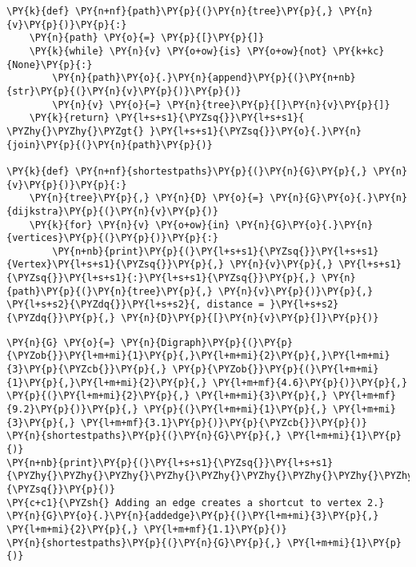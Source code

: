 \begin{Verbatim}[commandchars=\\\{\}]
\PY{k}{def} \PY{n+nf}{path}\PY{p}{(}\PY{n}{tree}\PY{p}{,} \PY{n}{v}\PY{p}{)}\PY{p}{:}
    \PY{n}{path} \PY{o}{=} \PY{p}{[}\PY{p}{]}
    \PY{k}{while} \PY{n}{v} \PY{o+ow}{is} \PY{o+ow}{not} \PY{k+kc}{None}\PY{p}{:}
        \PY{n}{path}\PY{o}{.}\PY{n}{append}\PY{p}{(}\PY{n+nb}{str}\PY{p}{(}\PY{n}{v}\PY{p}{)}\PY{p}{)}
        \PY{n}{v} \PY{o}{=} \PY{n}{tree}\PY{p}{[}\PY{n}{v}\PY{p}{]}
    \PY{k}{return} \PY{l+s+s1}{\PYZsq{}}\PY{l+s+s1}{ \PYZhy{}\PYZhy{}\PYZgt{} }\PY{l+s+s1}{\PYZsq{}}\PY{o}{.}\PY{n}{join}\PY{p}{(}\PY{n}{path}\PY{p}{)}

\PY{k}{def} \PY{n+nf}{shortestpaths}\PY{p}{(}\PY{n}{G}\PY{p}{,} \PY{n}{v}\PY{p}{)}\PY{p}{:}
    \PY{n}{tree}\PY{p}{,} \PY{n}{D} \PY{o}{=} \PY{n}{G}\PY{o}{.}\PY{n}{dijkstra}\PY{p}{(}\PY{n}{v}\PY{p}{)}
    \PY{k}{for} \PY{n}{v} \PY{o+ow}{in} \PY{n}{G}\PY{o}{.}\PY{n}{vertices}\PY{p}{(}\PY{p}{)}\PY{p}{:}
        \PY{n+nb}{print}\PY{p}{(}\PY{l+s+s1}{\PYZsq{}}\PY{l+s+s1}{Vertex}\PY{l+s+s1}{\PYZsq{}}\PY{p}{,} \PY{n}{v}\PY{p}{,} \PY{l+s+s1}{\PYZsq{}}\PY{l+s+s1}{:}\PY{l+s+s1}{\PYZsq{}}\PY{p}{,} \PY{n}{path}\PY{p}{(}\PY{n}{tree}\PY{p}{,} \PY{n}{v}\PY{p}{)}\PY{p}{,} \PY{l+s+s2}{\PYZdq{}}\PY{l+s+s2}{, distance = }\PY{l+s+s2}{\PYZdq{}}\PY{p}{,} \PY{n}{D}\PY{p}{[}\PY{n}{v}\PY{p}{]}\PY{p}{)}
\end{Verbatim}



\begin{Verbatim}[commandchars=\\\{\}]
\PY{n}{G} \PY{o}{=} \PY{n}{Digraph}\PY{p}{(}\PY{p}{\PYZob{}}\PY{l+m+mi}{1}\PY{p}{,}\PY{l+m+mi}{2}\PY{p}{,}\PY{l+m+mi}{3}\PY{p}{\PYZcb{}}\PY{p}{,} \PY{p}{\PYZob{}}\PY{p}{(}\PY{l+m+mi}{1}\PY{p}{,}\PY{l+m+mi}{2}\PY{p}{,} \PY{l+m+mf}{4.6}\PY{p}{)}\PY{p}{,} \PY{p}{(}\PY{l+m+mi}{2}\PY{p}{,} \PY{l+m+mi}{3}\PY{p}{,} \PY{l+m+mf}{9.2}\PY{p}{)}\PY{p}{,} \PY{p}{(}\PY{l+m+mi}{1}\PY{p}{,} \PY{l+m+mi}{3}\PY{p}{,} \PY{l+m+mf}{3.1}\PY{p}{)}\PY{p}{\PYZcb{}}\PY{p}{)}
\PY{n}{shortestpaths}\PY{p}{(}\PY{n}{G}\PY{p}{,} \PY{l+m+mi}{1}\PY{p}{)}
\PY{n+nb}{print}\PY{p}{(}\PY{l+s+s1}{\PYZsq{}}\PY{l+s+s1}{\PYZhy{}\PYZhy{}\PYZhy{}\PYZhy{}\PYZhy{}\PYZhy{}\PYZhy{}\PYZhy{}\PYZhy{}\PYZhy{}\PYZhy{}\PYZhy{}\PYZhy{}\PYZhy{}\PYZhy{}\PYZhy{}\PYZhy{}\PYZhy{}\PYZhy{}\PYZhy{}\PYZhy{}\PYZhy{}\PYZhy{}\PYZhy{}}\PY{l+s+s1}{\PYZsq{}}\PY{p}{)}
\PY{c+c1}{\PYZsh{} Adding an edge creates a shortcut to vertex 2.}
\PY{n}{G}\PY{o}{.}\PY{n}{addedge}\PY{p}{(}\PY{l+m+mi}{3}\PY{p}{,} \PY{l+m+mi}{2}\PY{p}{,} \PY{l+m+mf}{1.1}\PY{p}{)}
\PY{n}{shortestpaths}\PY{p}{(}\PY{n}{G}\PY{p}{,} \PY{l+m+mi}{1}\PY{p}{)}
\end{Verbatim}

